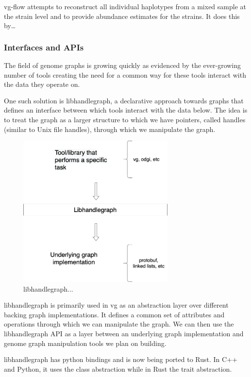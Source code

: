 \documentclass[11pt]{article}
\begin{document}
vg-flow \cite{baaijensStrainawareAssemblyGenomes2020} attempts to reconstruct all 
individual haplotypes from a mixed sample at the strain level and to provide
abundance estimates for the strains. It does this by\ldots{}

\subsubsection{Interfaces and APIs}
\label{sec:org9d759a6}
The field of genome graphs is growing quickly as evidenced by the ever-growing
number of tools creating the need for a common way for these tools interact with
the data they operate on.

One such solution is libhandlegraph, a declarative approach towards graphs that
defines an interface between which tools interact with the data below. 
The idea is to treat the graph as a larger structure to which we have pointers,
called handles (similar to  Unix file handles), through which we manipulate the
graph. 

\begin{figure}[h]
\centering
\includegraphics[width=0.7\textwidth]{figures/libhandlegraph.png}
\caption{libhandlegraph...}
\end{figure}

libhandlegraph is primarily used in vg as an abstraction layer over different
backing graph implementations.
It defines a common set of attributes and operations through which we can
manipulate the graph. We can then use the libhandlegraph API as a layer between
an underlying graph implementation and genome graph manipulation tools we plan 
on building.

libhandlegraph has python bindings and is now being ported to Rust. In C++ and 
Python, it uses the class abstraction while in Rust the trait abstraction.
\end{document}
